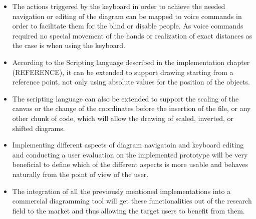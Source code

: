 \begin{itemize}
\item The actions triggered by the keyboard in order to achieve the needed navigation or editing of the diagram can be mapped to voice commands in order to facilitate them for the blind or disable people. As voice commands required no special movement of the hands or realization of exact distances as the case is when using the keyboard.

\item According to the Scripting language described in the implementation chapter (REFERENCE), it can be extended to support drawing starting from a reference point, not only using absolute values for the position of the objects.

\item The scripting language can also be extended to support the scaling of the canvas or the change of the coordinates before the insertion of the file, or any other chunk of code, which will allow the drawing of scaled, inverted, or shifted diagrams.

\item Implementing different aspects of diagram navigatoin and keyboard editing and conducting a user evaluation on the implemented prototype will be very beneficial to define which of the different aspects is more usable and behaves naturally from the point of view of the user.

\item The integration of all the previously mentioned implementations into a commercial diagramming tool will get these functionalities out of the research field to the market and thus allowing the target users to benefit from them.
\end{itemize}
